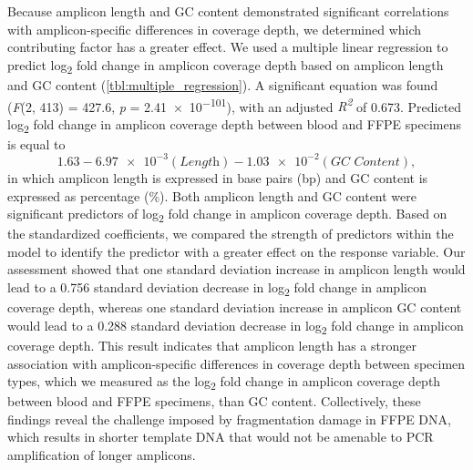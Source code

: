 Because amplicon length and GC content demonstrated significant correlations with amplicon-specific differences in coverage depth, we determined which contributing factor has a greater effect. We used a multiple linear regression to predict log\textsubscript{2} fold change in amplicon coverage depth based on amplicon length and GC content (\autoref{tbl:multiple_regression}). A significant equation was found (\textit{F}(2, 413) = 427.6, \textit{p} = \num{2.41e-101}), with an adjusted \textit{R\textsuperscript{2}} of 0.673. Predicted log\textsubscript{2} fold change in amplicon coverage depth between blood and FFPE specimens is equal to $$1.63 - \num{6.97e-3}(\textit{Length}) - \num{1.03e-2}(\textit{GC Content}),$$ in which amplicon length is expressed in base pairs (bp) and GC content is expressed as percentage (\%). Both amplicon length and GC content were significant predictors of log\textsubscript{2} fold change in amplicon coverage depth. Based on the standardized coefficients, we compared the strength of predictors within the model to identify the predictor with a greater effect on the response variable. Our assessment showed that one standard deviation increase in amplicon length would lead to a 0.756 standard deviation decrease in log\textsubscript{2} fold change in amplicon coverage depth, whereas one standard deviation increase in amplicon GC content would lead to a 0.288 standard deviation decrease in log\textsubscript{2} fold change in amplicon coverage depth. This result indicates that amplicon length has a stronger association with amplicon-specific differences in coverage depth between specimen types, which we measured as the log\textsubscript{2} fold change in amplicon coverage depth between blood and FFPE specimens, than GC content. Collectively, these findings reveal the challenge imposed by fragmentation damage in FFPE DNA, which results in shorter template DNA that would not be amenable to PCR amplification of longer amplicons.


